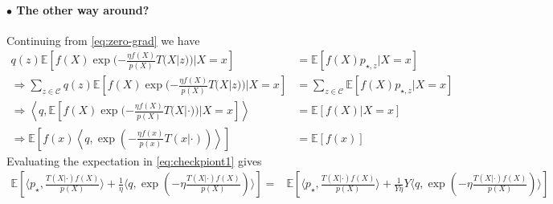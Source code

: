 \documentclass{article}
\theoremstyle{plain}
\theoremstyle{definition}
\theoremstyle{remark}
\newcommand{\E}{\mathbb E}
\newcommand{\cC}{\mathcal C}
\theoremstyle{definition}
\begin{document}
\paragraph{$\bullet$ The other way around?}
Continuing from \cref{eq:zero-grad} we have
\begin{align*}
    q(z)
    \E\!\left[
        f(X)
        \exp(- \tfrac{\eta f(X)}{p(X)} T(X|z))
        | X = x
        \right]
     & =
    \E\!\left[
        f(X) p_{\star, z}
        | X = x
        \right]
    \\
    \Rightarrow
    \sum_{z \in \cC}
    q(z)
    \E\!\left[
        f(X)
        \exp(- \tfrac{\eta f(X)}{p(X)} T(X|z))
        | X = x
        \right]
     & =
    \sum_{z \in \cC}
    \E\!\left[
        f(X) p_{\star, z}
        | X = x
        \right]
    \\
    \Rightarrow
    \left\langle
    q,
    \E\!\left[
        f(X)
        \exp(- \tfrac{\eta f(X)}{p(X)} T(X|\cdot))
        | X = x
        \right]
    \right\rangle
     & =
    \E\!\left[
        f(X)
        | X = x
        \right]
    \\
    \Rightarrow
    \E\!\left[
        f(x)
        \left\langle
        q,
        \exp(- \tfrac{\eta f(x)}{p(x)} T(x|\cdot))
        \right\rangle
        \right]
     & =
    \E\!\left[
        f(x)
        \right]
\end{align*}
Evaluating the expectation in \cref{eq:checkpiont1} gives
\begin{align*}
    \E\!\left[
        \langle p_\star, \tfrac{T(X|\cdot) f(X)}{p(X)} \rangle
        + \frac{1}{\eta}
        \langle q, \exp(- \eta \tfrac{T(X|\cdot) f(X)}{p(X)})\rangle
        \right]
    = & \E\!\left[
        \langle p_\star, \tfrac{T(X|\cdot) f(X)}{p(X)} \rangle
        + \frac{1}{Y\eta}
        Y
        \langle q, \exp(- \eta \tfrac{T(X|\cdot) f(X)}{p(X)})\rangle
        \right]
\end{align*}
\end{document}
